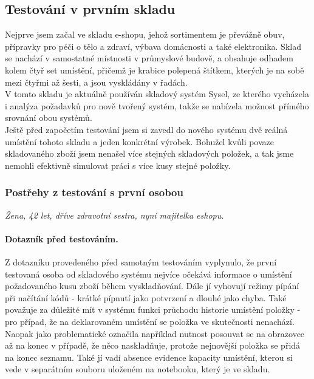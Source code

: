 \subsection{Testování v prvním skladu}

Nejprve jsem začal ve skladu e-shopu, jehož sortimentem je převážně obuv, přípravky pro péči o tělo a zdraví, výbava domácnosti a také elektronika. Sklad se nachází v samostatné místnosti v průmyslové budově, a obsahuje odhadem kolem čtyř set umístění, přičemž  je krabice polepená štítkem, kterých je na sobě mezi čtyřmi až šesti, a jsou vyskládány v řadách.\\
V tomto skladu je aktuálně používán skladový systém Sysel, ze kterého vycházela i analýza požadavků pro nově tvořený systém, takže se nabízela možnost přímého srovnání obou systémů.\\
Ještě před započetím testování jsem si zavedl do nového systému dvě reálná umístění tohoto skladu a jeden konkrétní výrobek. Bohužel kvůli povaze skladovaného zboží jsem nenašel více stejných skladových položek, a tak jsme nemohli efektivně simulovat práci s více kusy stejné položky.


\subsubsection{Postřehy z testování s první osobou}
\emph{Žena, 42 let, dříve zdravotní sestra, nyní majitelka eshopu.}

\paragraph{Dotazník před testováním.} Z dotazníku provedeného před samotným testováním vyplynulo, že první testovaná osoba od skladového systému nejvíce očekává informace o umístění požadovaného kusu zboží během vyskladňování. Dále jí vyhovují režimy pípání při načítání kódů - krátké pípnutí jako potvrzení a dlouhé jako chyba. Také považuje za důležité mít v systému funkci průchodu historie umístění položky - pro případ, že na deklarovaném umístění se položka ve skutečnosti nenachází. Naopak jako problematické označila například nutnost posouvat se na obrazovce až na konec v případě, že něco naskladňuje, protože nejnovější položka se přidá na konec seznamu. Také jí vadí absence evidence kapacity umístění, kterou si vede v separátním souboru uloženém na notebooku, který je ve skladu.\\

